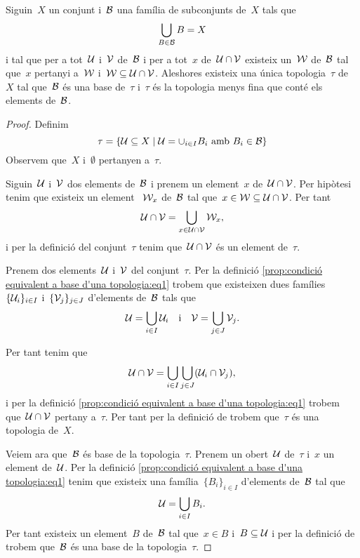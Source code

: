 \documentclass[../../Main.tex]{subfiles}
\begin{document}
	\begin{proposition}
		\label{prop:condició equivalent a base d'una topologia}
		\label{prop:condició per que una topologia sigui la més fina que conté una base}
		Siguin~\(X\) un conjunt i~\(\mathcal{B}\) una família de subconjunts de~\(X\) tals que
		\[
		    \bigcup_{B\in\mathcal{B}}B=X
		\]
		i tal que per a tot~\(\mathcal{U}\) i~\(\mathcal{V}\) de~\(\mathcal{B}\) i per a tot~\(x\) de~\(\mathcal{U}\cap\mathcal{V}\) existeix un~\(\mathcal{W}\) de~\(\mathcal{B}\) tal que~\(x\) pertanyi a~\(\mathcal{W}\) i~\(\mathcal{W}\subseteq\mathcal{U}\cap\mathcal{V}\).	Aleshores existeix una única topologia~\(\tau\) de~\(X\) tal que~\(\mathcal{B}\) és una base de~\(\tau\) i~\(\tau\) és la topologia menys fina que conté els elements de~\(\mathcal{B}\).
		\begin{proof}
			Definim
			\begin{equation}
				\label{prop:condició equivalent a base d'una topologia:eq1}
				\tau=\left\{\obert{U}\subseteq X\mid\obert{U}=\cup_{i\in I}B_{i}\text{ amb }B_{i}\in\base{B}\right\}
			\end{equation}
			Observem que~\(X\) i~\(\emptyset\) pertanyen a~\(\tau\).

			Siguin~\(\mathcal{U}\) i~\(\mathcal{V}\) dos elements de~\(\mathcal{B}\) i prenem un element~\(x\) de~\(\mathcal{U}\cap\mathcal{V}\).
			Per hipòtesi tenim que existeix un element ~\(\mathcal{W}_{x}\) de~\(\mathcal{B}\) tal que~\(x\in\mathcal{W}\subseteq\mathcal{U}\cap\mathcal{V}\).
			Per tant
			\[
			    \mathcal{U}\cap\mathcal{V}=\bigcup_{x\in\mathcal{U}\cap\mathcal{V}}\mathcal{W}_{x},
			\]
			i per la definició del conjunt~\(\tau\) tenim que~\(\mathcal{U}\cap\mathcal{V}\) és un element de~\(\tau\).

			Prenem dos elements~\(\mathcal{U}\) i~\(\mathcal{V}\) del conjunt~\(\tau\).
			Per la definició \eqref{prop:condició equivalent a base d'una topologia:eq1} trobem que existeixen dues famílies~\(\{\mathcal{U}_{i}\}_{i\in I}\) i~\(\{\mathcal{V}_{j}\}_{j\in J}\) d'elements de~\(\mathcal{B}\) tals que
			\[
			    \mathcal{U}=\bigcup_{i\in I}\mathcal{U}_{i}\quad\text{i}\quad\mathcal{V}=\bigcup_{j\in J}\mathcal{V}_{j}.
			\]

			Per tant tenim que
			\[
			    \mathcal{U}\cap\mathcal{V}=\bigcup_{i\in I}\bigcup_{j\in J}(\mathcal{U}_{i}\cap\mathcal{V}_{j}),
			\]
			i per la definició \eqref{prop:condició equivalent a base d'una topologia:eq1} trobem que~\(\mathcal{U}\cap\mathcal{V}\) pertany a~\(\tau\).
			Per tant per la definició de  trobem que~\(\tau\) és una topologia de~\(X\).

			Veiem ara que~\(\mathcal{B}\) és base de la topologia~\(\tau\).
			Prenem un obert~\(\mathcal{U}\) de~\(\tau\) i~\(x\) un element de~\(\mathcal{U}\).
			Per la definició \eqref{prop:condició equivalent a base d'una topologia:eq1} tenim que existeix una família~\(\{B_{i}\}_{i\in I}\) d'elements de~\(\mathcal{B}\) tal que
			\[
			    \mathcal{U}=\bigcup_{i\in I}B_{i}.
			\]
			Per tant existeix un element~\(B\) de~\(\mathcal{B}\) tal que~\(x\in B\) i~\(B\subseteq\mathcal{U}\) i per la definició de  trobem que~\(\mathcal{B}\) és una base de la topologia~\(\tau\).


\end{proof}
\end{proposition}
\end{document}
